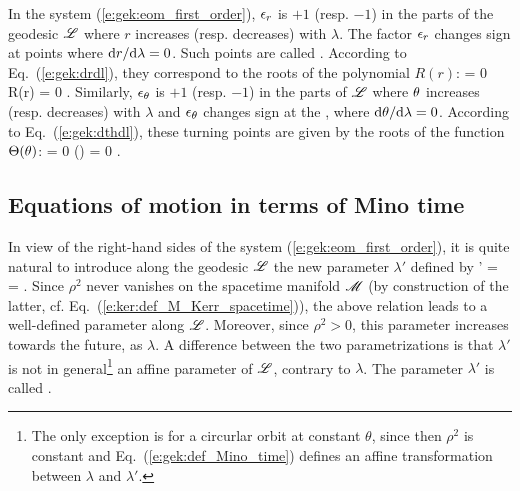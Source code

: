 In the system (\ref{e:gek:eom_first_order}), $\epsilon_r$
is $+1$ (resp. $-1$) in the parts of the geodesic $\mathscr{L}$ where $r$ increases
(resp. decreases) with $\lambda$. The factor $\epsilon_r$ changes sign at points where $\mathrm{d} r/\mathrm{d}\lambda = 0$. Such points
are called . According to Eq.~(\ref{e:gek:drdl}), they correspond to the roots of the polynomial $R(r)$:
\be
     = 0 \iff R(r) = 0 .
\ee
Similarly, $\epsilon_\theta$
is $+1$ (resp. $-1$) in the parts of $\mathscr{L}$ where $\theta$ increases
(resp. decreases) with $\lambda$ and $\epsilon_\theta$ changes sign at the
, where $\mathrm{d}\theta/\mathrm{d}\lambda = 0$. According to Eq.~(\ref{e:gek:dthdl}),
these turning points are given by the roots of the function $\Theta(\theta)$:
\be
    \derd{\th}{\lambda} = 0 \iff \Theta(\th) = 0 .
\ee


\subsection{Equations of motion in terms of Mino time}

In view of the right-hand sides of the system (\ref{e:gek:eom_first_order}),
it is quite natural to introduce along the geodesic $\mathscr{L}$ the new
parameter $\lambda'$ defined by
\be \label{e:gek:def_Mino_time}
    \D\lambda' = 
     =  .
\ee
Since $\rho^2$ never vanishes on the spacetime manifold $\mathscr{M}$ (by construction
of the latter, cf. Eq.~(\ref{e:ker:def_M_Kerr_spacetime})), the above relation
leads to a well-defined parameter along $\mathscr{L}$. Moreover, since $\rho^2>0$, this
parameter increases towards the future, as $\lambda$. A difference between
the two parametrizations is that $\lambda'$ is not in general\footnote{The only
exception is for a circurlar orbit at constant $\theta$, since then $\rho^2$
is constant and Eq.~(\ref{e:gek:def_Mino_time}) defines an affine transformation
between $\lambda$ and $\lambda'$.} an affine parameter
of $\mathscr{L}$, contrary to $\lambda$.
The parameter $\lambda'$ is called 
\cite{Mino03}.

